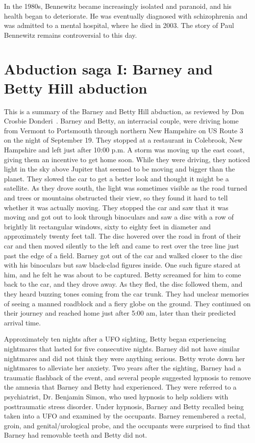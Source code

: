 In the 1980s, Bennewitz became increasingly isolated and paranoid, and his health began to deteriorate. He was eventually diagnosed with schizophrenia and was admitted to a mental hospital, where he died in 2003. The story of Paul Bennewitz remains controversial to this day.


\section{Abduction saga I: Barney and Betty Hill abduction}
\label{2023-UFO-part-Perception-abductions-bbha}

This is a summary of the Barney and Betty Hill abduction, as reviewed by Don Crosbie Donderi~\cite{Donderi2013Jun}.
Barney and Betty, an interracial couple, were driving home from Vermont to Portsmouth through northern New Hampshire on US Route 3 on the night of September 19. They stopped at a restaurant in Colebrook, New Hampshire and left just after 10:00 p.m. A storm was moving up the east coast, giving them an incentive to get home soon. While they were driving, they noticed light in the sky above Jupiter that seemed to be moving and bigger than the planet. They slowed the car to get a better look and thought it might be a satellite. As they drove south, the light was sometimes visible as the road turned and trees or mountains obstructed their view, so they found it hard to tell whether it was actually moving. They stopped the car and saw that it was moving and got out to look through binoculars and saw a disc with a row of brightly lit rectangular windows, sixty to eighty feet in diameter and approximately twenty feet tall. The disc hovered over the road in front of their car and then moved silently to the left
and came to rest over the tree line just past the edge of a field.
Barney got out of the car and walked closer to the disc with his binoculars but saw black-clad figures inside.
One such figure stared at him, and he felt he was about to be captured.
Betty screamed for him to come back to the car, and they drove away. As they fled, the disc followed them, and they heard buzzing tones coming from the car trunk. They had unclear memories of seeing a manned roadblock and a fiery globe on the ground.
They continued on their journey and reached home just after 5:00 am, later than their predicted arrival time.

Approximately ten nights after a UFO sighting, Betty began experiencing nightmares that lasted for five consecutive nights. Barney did not have similar nightmares and did not think they were anything serious. Betty wrote down her nightmares to alleviate her anxiety. Two years after the sighting, Barney had a traumatic flashback of the event, and several people suggested hypnosis to remove the amnesia that Barney and Betty had experienced. They were referred to a psychiatrist, Dr. Benjamin Simon, who used hypnosis to help soldiers with posttraumatic stress disorder. Under hypnosis, Barney and Betty recalled being taken into a UFO and examined by the occupants. Barney remembered a rectal, groin, and
genital/urological probe, and the occupants were surprised to find that Barney had removable teeth and Betty did not.

